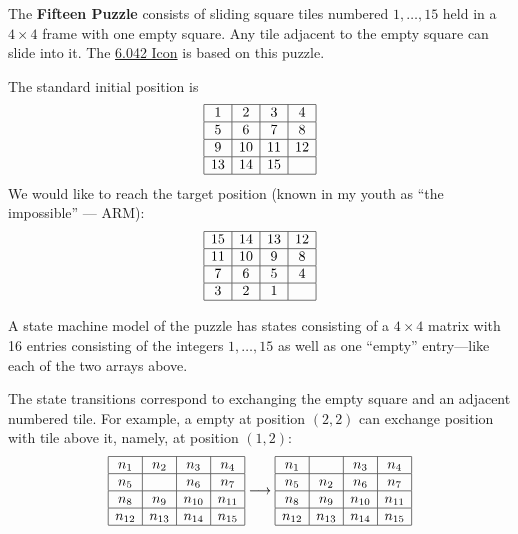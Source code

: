 \documentclass[handout]{mcs}
\begin{document}
\begin{problem} 
The \textbf{Fifteen Puzzle} consists of sliding square tiles numbered
$1,\dots,15$ held in a $4\times4$ frame with one empty square.  Any tile
adjacent to the empty square can slide into it.  The
\href{http://theory.lcs.mit.edu/classes/6.042/spring02/}{6.042 Icon} is
based on this puzzle.

The standard initial position is
\[\begin{array}{|c|c|c|c|}
\hline 1 & 2 & 3 & 4\\
\hline 5 & 6 & 7 & 8\\
\hline 9 & 10 & 11 & 12\\
\hline 13 & 14  & 15 &  \\
\hline
\end{array}\]
We would like to reach the target position (known in my youth as ``the
impossible'' --- ARM):
\[\begin{array}{|c|c|c|c|}
\hline 15 & 14 & 13 & 12\\
\hline 11 & 10 & 9 & 8\\
\hline7 & 6 & 5 & 4\\
\hline3 & 2 & 1 & \\
\hline
\end{array}\]

A state machine model of the puzzle has states consisting of a $4\times 4$
matrix with 16 entries consisting of the integers $1,\dots,15$ as well as
one ``empty'' entry---like each of the two arrays above.

The state transitions correspond to exchanging the empty square and an
adjacent numbered tile.  For example, a empty at position $(2,2)$ can
exchange position with tile above it, namely, at position $(1,2)$:
\[\begin{array}{|c|c|c|c|}
\hline n_1 & n_2 & n_3 & n_4\\
\hline n_5 &  & n_6 & n_7\\
\hline n_8  & n_9 & n_{10} & n_{11}\\
\hline n_{12} & n_{13} & n_{14}  & n_{15}\\
\hline
\end{array} \longrightarrow
\begin{array}{|c|c|c|c|}
\hline n_1 &   & n_3 & n_4\\
\hline n_5 & n_2 & n_6 & n_7\\
\hline n_8  & n_9 & n_{10} & n_{11}\\
\hline n_{12} & n_{13} & n_{14}  & n_{15}\\
\hline
\end{array} 
\]


\end{problem}
\end{document}
